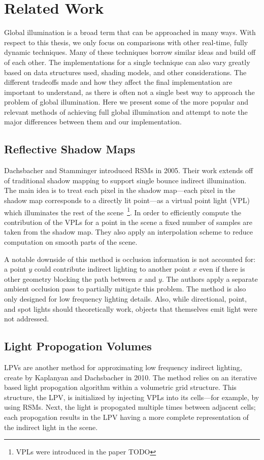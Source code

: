 \chapter{Related Work}

Global illumination is a broad term that can be approached in many ways. With respect to this thesis, we only focus on comparisons with other real-time, fully dynamic techniques. Many of these techniques borrow similar ideas and build off of each other. The implementations for a single technique can also vary greatly based on data structures used, shading models, and other considerations. The different tradeoffs made and how they affect the final implementation are important to understand, as there is often not a single best way to approach the problem of global illumination. Here we present some of the more popular and relevant methods of achieving full global illumination and attempt to note the major differences between them and our implementation.

\section{Reflective Shadow Maps}
Dachsbacher and Stamminger introduced RSMs in 2005. Their work extends off of traditional shadow mapping to support single bounce indirect illumination. The main idea is to treat each pixel in the shadow map---each pixel in the shadow map corresponds to a directly lit point---as a virtual point light (VPL) which illuminates the rest of the scene~\footnote{VPLs were introduced in the paper TODO}. In order to efficiently compute the contribution of the VPLs for a point in the scene a fixed number of samples are taken from the shadow map. They also apply an interpolation scheme to reduce computation on smooth parts of the scene.

A notable downside of this method is occlusion information is not accounted for: a point $y$ could contribute indirect lighting to another point $x$ even if there is other geometry blocking the path between $x$ and $y$. The authors apply a separate ambient occlusion pass to partially mitigate this problem. The method is also only designed for low frequency lighting details. Also, while directional, point, and spot lights should theoretically work, objects that themselves emit light were not addressed.

\section{Light Propogation Volumes}
LPVs are another method for approximating low frequency indirect lighting, create by Kaplanyan and Dachsbacher in 2010. The method relies on an iterative based light propogation algorithm within a volumetric grid structure. This structure, the LPV, is initialized by injecting VPLs into its cells---for example, by using RSMs. Next, the light is propogated multiple times between adjacent cells; each propogation results in the LPV having a more complete representation of the indirect light in the scene.

